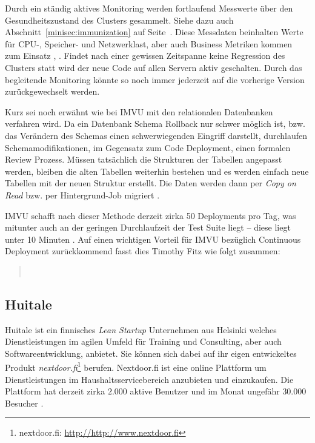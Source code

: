 Durch ein ständig aktives Monitoring werden fortlaufend Messwerte über den
Gesundheitszustand des Clusters gesammelt. Siehe dazu auch
Abschnitt~\ref{minisec:immunization} auf Seite~\pageref{minisec:immunization}.
Diese Messdaten beinhalten Werte für CPU-, Speicher- und Netzwerklast, aber
auch Business Metriken kommen zum Einsatz \cite{Fitz2009-02-10},
\cite{imvu09}. Findet nach einer gewissen Zeitspanne keine Regression des
Clusters statt wird der neue Code auf allen Servern aktiv geschalten. Durch
das begleitende Monitoring könnte so noch immer jederzeit auf die vorherige
Version zurückgewechselt werden.

Kurz sei noch erwähnt wie bei IMVU mit den relationalen Datenbanken verfahren
wird. Da ein Datenbank Schema Rollback nur schwer möglich ist, bzw. das
Verändern des Schemas einen schwerwiegenden Eingriff darstellt, durchlaufen
Schemamodifikationen, im Gegensatz zum Code Deployment, einen formalen Review
Prozess. Müssen tatsächlich die Strukturen der Tabellen angepasst werden,
bleiben die alten Tabellen weiterhin bestehen und es werden einfach neue
Tabellen mit der neuen Struktur erstellt. Die Daten werden dann per \emph{Copy
on Read} bzw. per Hintergrund-Job migriert \cite{imvu10}.

IMVU schafft nach dieser Methode derzeit zirka 50 Deployments pro Tag, was
mitunter auch an der geringen Durchlaufzeit der Test Suite liegt -- diese
liegt unter 10 Minuten \cite{Fitz2009-02-10}. Auf einen wichtigen
Vorteil für IMVU bezüglich Continuous Deployment zurückkommend fasst dies
Timothy Fitz wie folgt zusammen:

\begin{quote}
~\cite{Fitz2009-02-08}
\end{quote}


\subsection{Huitale}

Huitale ist ein finnisches \emph{Lean Startup} Unternehmen aus Helsinki
welches Dienstleistungen im agilen Umfeld für Training und Consulting, aber
auch Softwareentwicklung, anbietet. Sie können sich dabei auf ihr eigen
entwickeltes Produkt \emph{nextdoor.fi}\footnote{nextdoor.fi:
\url{http://http://www.nextdoor.fi}} berufen. Nextdoor.fi ist eine online
Plattform um Dienstleistungen im Haushaltsservicebereich anzubieten und
einzukaufen. Die Plattform hat derzeit zirka $2.000$ aktive Benutzer und im
Monat ungefähr $30.000$ Besucher \cite{Taipale2010}.

